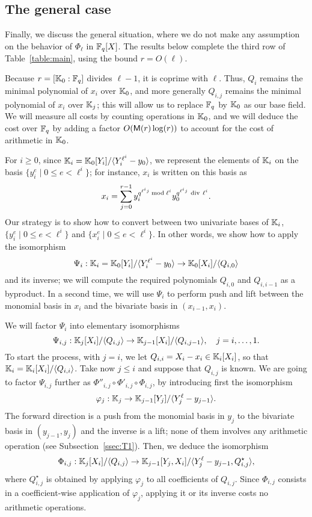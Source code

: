 \documentclass{sig-alternate}
\begin{document}
\subsection{The general case}

Finally, we discuss the general situation, where we do not make any
assumption on the behavior of $\Phi_\ell$ in $\mathbb{F}_q[X]$. The results
below complete the third row of Table~\ref{table:main}, using the
bound $r=O(\ell)$.

Because $r=[\mathbb{K}_0 : \mathbb{F}_q]$ divides $\ell-1$, it is coprime with
$\ell$. Thus, $Q_i$ remains the minimal polynomial of $x_i$ over
$\mathbb{K}_0$, and more generally $Q_{i,j}$ remains the minimal polynomial of
$x_i$ over $\mathbb{K}_{j}$; this will allow us to replace $\mathbb{F}_q$ by $\mathbb{K}_0$ as
our base field. We will measure all costs by counting operations in
$\mathbb{K}_0$, and we will deduce the cost over $\mathbb{F}_q$ by adding a factor
$O(\mathsf{M}(r)\log(r))$ to account for the cost of arithmetic in $\mathbb{K}_0$.

For $i \ge 0$, since $\mathbb{K}_i=\mathbb{K}_0[Y_i]/\langle Y_i^{\ell^i}-y_0\rangle$,
we represent the elements of $\mathbb{K}_i$ on the basis $\{y_i^e \mid 0 \le e
< \ell^i\}$; for instance, $x_i$ is written on this basis as
\begin{equation}\label{eq-def:xiyi}
x_i = \sum_{j = 0}^{r-1} y_i^{q^{\ell^i j} \bmod \ell^i}
y_0^{q^{\ell^i j} {\rm~div~} \ell^i}. 
\end{equation}
Our strategy is to show how to convert between two univariate bases of
$\mathbb{K}_i$, $\{y_i^e \mid 0 \le e < \ell^i\}$ and $\{x_i^e \mid 0 \le e <
\ell^i\}$. In other words, we show how to apply the isomorphism
$$\Psi_i: \mathbb{K}_i=\mathbb{K}_0[Y_i]/\langle Y_i^{\ell^i}-y_0\rangle \to
\mathbb{K}_0[X_i]/\langle Q_{i,0}\rangle$$ and its inverse; we will compute
the required polynomials $Q_{i,0}$ and $Q_{i,i-1}$ as a byproduct. In
a second time, we will use $\Psi_i$ to perform push and lift between
the monomial basis in $x_i$ and the bivariate basis in
$(x_{i-1},x_i)$.

We will factor $\Psi_i$ into elementary
isomorphisms
$$\Psi_{i,j}: \mathbb{K}_j[X_i]/\langle Q_{i,j}\rangle \to
\mathbb{K}_{j-1}[X_i]/\langle Q_{i,j-1}\rangle, \quad j=i,\dots,1.$$ To start
the process, with $j=i$, we let $Q_{i,i}=X_i-x_i \in \mathbb{K}_i[X_i]$, so
that $\mathbb{K}_i=\mathbb{K}_i[X_i]/\langle Q_{i,i} \rangle$.
Take now $j \le i$ and suppose that $Q_{i,j}$ is known. We are going to
factor $\Psi_{i,j}$ further as $\Phi''_{i,j} \circ \Phi'_{i,j} \circ
\Phi_{i,j}$, by introducing first the isomorphism
$$\varphi_j: \mathbb{K}_j \to \mathbb{K}_{j-1}[Y_j]/\langle Y_j^\ell-y_{j-1}\rangle.$$
The forward direction is a push from the monomial basis in $y_j$ to
the bivariate basis in $(y_{j-1},y_j)$ and the inverse is a lift; none
of them involves any arithmetic operation (see
Subsection~\ref{ssec:T1}).  Then, we deduce the isomorphism
$$\Phi_{i,j}: \mathbb{K}_j[X_i]/\langle Q_{i,j} \rangle \to
\mathbb{K}_{j-1}[Y_j,X_i]/\langle Y_j^\ell-y_{j-1}, Q^\star_{i,j}\rangle,$$
where $Q^\star_{i,j}$ is obtained by applying $\varphi_j$ to all
coefficients of $Q_{i,j}$. Since $\Phi_{i,j}$ consists in a
coefficient-wise application of $\varphi_j$, applying it or its
inverse costs no arithmetic operations.
\end{document}

